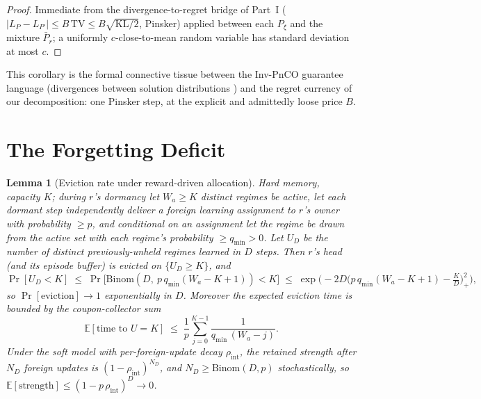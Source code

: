 \documentclass[11pt,a4paper]{article}
\theoremstyle{definition}
\theoremstyle{plain}
\newtheorem{lemma}{Lemma}[section]
\newcommand{\E}{\mathbb{E}}
\newcommand{\KL}{\mathrm{KL}}
\newcommand{\TV}{\mathrm{TV}}
\begin{document}
\begin{proof}
Immediate from the divergence-to-regret bridge of Part~I
($|L_P - L_{P'}| \le B\,\TV \le B\sqrt{\KL/2}$, Pinsker) applied
between each $P_\xi$ and the mixture $\bar P_r$; a uniformly
$c$-close-to-mean random variable has standard deviation at most $c$.
\end{proof}

This corollary is the formal connective tissue between the Inv-PnCO
guarantee language (divergences between solution distributions
\cite{yan2026invpnco}) and the regret currency of our decomposition: one
Pinsker step, at the explicit and admittedly loose price $B$.

\section{The Forgetting Deficit}
\label{sec:dd4-forget}

\begin{lemma}[Eviction rate under reward-driven allocation]
\label{lem:dd4-eviction}
Hard memory, capacity $K$; during $r$'s dormancy let $W_a \ge K$ distinct
regimes be active, let each dormant step independently deliver a foreign
learning assignment to $r$'s owner with probability $\ge p$, and
conditional on an assignment let the regime be drawn from the active set
with each regime's probability $\ge q_{\min} > 0$. Let $U_D$ be the
number of \emph{distinct} previously-unheld regimes learned in $D$ steps.
Then $r$'s head (and its episode buffer) is evicted on
$\{U_D \ge K\}$, and
\[
  \Pr[U_D < K] \;\le\;
  \Pr\!\big[\mathrm{Binom}(D,\ p\, q_{\min} (W_a - K + 1)) < K\big]
  \;\le\; \exp\!\Big(\!-2 D \big(p\,q_{\min}(W_a{-}K{+}1) -
  \tfrac{K}{D}\big)_+^2\Big),
\]
so $\Pr[\text{eviction}] \to 1$ exponentially in $D$. Moreover the
expected eviction time is bounded by the coupon-collector sum
\[
  \E[\text{time to } U = K] \;\le\; \frac{1}{p}
  \sum_{j=0}^{K-1} \frac{1}{q_{\min}\,(W_a - j)} .
\]
Under the soft model with per-foreign-update decay $\rho_{\mathrm{int}}$,
the retained strength after $N_D$ foreign updates is
$(1 - \rho_{\mathrm{int}})^{N_D}$, and $N_D \ge \mathrm{Binom}(D, p)$
stochastically, so $\E[\text{strength}] \le
(1 - p\,\rho_{\mathrm{int}})^{D} \to 0$.
\end{lemma}
\end{document}
